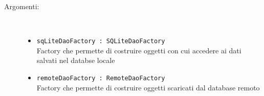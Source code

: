 \documentclass[../DefinizioneDiProdotto.tex]{subfiles}
\begin{document}
\begin{description}
\begin{itemize}
		\begin{description}
			\item[Argomenti:] \
			\begin{itemize}
				\item \texttt{sqLiteDaoFactory : SQLiteDaoFactory}\\
				Factory che permette di costruire oggetti con cui accedere ai dati salvati nel databse locale\item \texttt{remoteDaoFactory : RemoteDaoFactory}\\
				Factory che permette di costruire oggetti scaricati dal database remoto\end{itemize}
		\end{description}
	\end{itemize}
\end{description}
\end{document}
